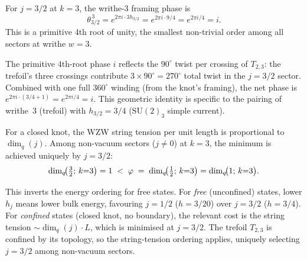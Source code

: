 \begin{proposition}
\label{P15:prop:wrt_phase}
For $j=3/2$ at $k=3$, the writhe-3 framing phase is
\begin{equation}
  \theta_{3/2}^{\,3}
  = e^{2\pi i\cdot 3h_{3/2}}
  = e^{2\pi i\cdot 9/4}
  = e^{2\pi i/4}
  = i.
  \label{P15:eq:theta32_cubed}
\end{equation}
This is a primitive $4$th root of unity, the smallest non-trivial order
among all sectors at writhe $w=3$.
\end{proposition}

\begin{remark}
\label{P15:rem:fourth_root_phase}
The primitive $4$th-root phase $i$ reflects the $90^\circ$ twist per
crossing of $T_{2,3}$: the trefoil's three crossings contribute
$3\times 90^\circ = 270^\circ$ total twist in the $j=3/2$ sector.
Combined with one full $360^\circ$ winding (from the knot's framing),
the net phase is $e^{2\pi i\cdot(3/4+1)} = e^{2\pi i/4} = i$.
This geometric identity is specific to the pairing of
writhe~$3$ (trefoil) with $h_{3/2}=3/4$ ($\mathrm{SU}(2)_3$ simple current).
\end{remark}

\begin{proposition}
\label{P15:prop:wrt_dim}
For a closed knot, the WZW string tension per unit length is proportional
to $\dim_q(j)$. Among non-vacuum sectors ($j\neq0$) at $k=3$,
the minimum is achieved uniquely by $j=3/2$:
\begin{equation}
  \dim_q\!\bigl(\tfrac{3}{2};\,k{=}3\bigr) = 1
  \;<\; \varphi \;=\; \dim_q\!\bigl(\tfrac{1}{2};\,k{=}3\bigr)
        = \dim_q\!\bigl(1;\,k{=}3\bigr).
  \label{P15:eq:dim_min}
\end{equation}
\end{proposition}

\begin{remark}
\label{P15:rem:inverts_energy_ordering}
This inverts the energy ordering for free states.
For \emph{free} (unconfined) states, lower $h_j$ means lower bulk energy,
favouring $j=1/2$ ($h=3/20$) over $j=3/2$ ($h=3/4$).
For \emph{confined} states (closed knot, no boundary),
the relevant cost is the string tension $\sim\dim_q(j)\cdot L$,
which is minimised at $j=3/2$.
The trefoil $T_{2,3}$ is confined by its topology, so the string-tension
ordering applies, uniquely selecting $j=3/2$ among non-vacuum sectors.
\end{remark}

